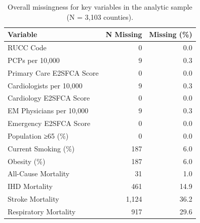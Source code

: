 \begin{table}[ht]
\centering
\small
\caption{Overall missingness for key variables in the analytic sample (N = 3,103 counties).}
\label{tab:missingness_overall}
\begin{tabular}{lrr}
\toprule
Variable & N Missing & Missing (\%) \\
\midrule
RUCC Code & 0 & 0.0 \\
PCPs per 10,000 & 9 & 0.3 \\
Primary Care E2SFCA Score & 0 & 0.0 \\
Cardiologists per 10,000 & 9 & 0.3 \\
Cardiology E2SFCA Score & 0 & 0.0 \\
EM Physicians per 10,000 & 9 & 0.3 \\
Emergency E2SFCA Score & 0 & 0.0 \\
Population ≥65 (\%) & 0 & 0.0 \\
Current Smoking (\%) & 187 & 6.0 \\
Obesity (\%) & 187 & 6.0 \\
All-Cause Mortality & 31 & 1.0 \\
IHD Mortality & 461 & 14.9 \\
Stroke Mortality & 1,124 & 36.2 \\
Respiratory Mortality & 917 & 29.6 \\
\bottomrule
\end{tabular}
\end{table}
